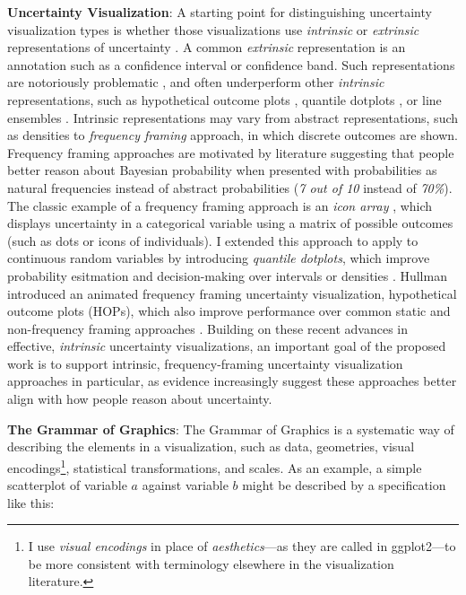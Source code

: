 \documentclass[11pt]{article}
\begin{document}
\noindent \textbf{Uncertainty Visualization}: A starting point for distinguishing uncertainty visualization types is whether those visualizations use \emph{intrinsic} or \emph{extrinsic} representations of uncertainty \cite{kay2016bus}. A common \emph{extrinsic} representation is an annotation such as a confidence interval or confidence band. Such representations are notoriously problematic \cite{belia2005ci}, and often underperform other \emph{intrinsic} representations, such as hypothetical outcome plots \cite{hullman2015hops, kale2018hypothetical}, quantile dotplots \cite{kay2016bus, Fernandes2018}, or line ensembles \cite{padilla2017effects}. Intrinsic representations may vary from abstract representations, such as densities \cite{Ibrekk1987} to \emph{frequency framing} approach, in which discrete outcomes are shown. Frequency framing approaches are motivated by literature suggesting that people better reason about Bayesian probability when presented with probabilities as natural frequencies instead of abstract probabilities \cite{Gigerenzer1995} (\eg \emph{7 out of 10} instead of \emph{70\%}). The classic example of a frequency framing approach is an \emph{icon array} \cite{Ancker2006}, which displays uncertainty in a categorical variable using a matrix of possible outcomes (such as dots or icons of individuals). I extended this approach to apply to continuous random variables by introducing \emph{quantile dotplots}, which improve probability esitmation and decision-making over intervals or densities \cite{kay2016bus, kale2018hypothetical}. Hullman \etal introduced an animated frequency framing uncertainty visualization, hypothetical outcome plots (HOPs), which also improve performance over common static and non-frequency framing approaches \cite{hullman2015hops,kale2018hypothetical}. Building on these recent advances in effective, \emph{intrinsic} uncertainty visualizations, an important goal of the proposed work is to support intrinsic, frequency-framing uncertainty visualization approaches in particular, as evidence increasingly suggest these approaches better align with how people reason about uncertainty.

\noindent \textbf{The Grammar of Graphics}: The Grammar of Graphics is a systematic way of describing the elements in a visualization, such as data, geometries, visual encodings\footnote{I use \emph{visual encodings} in place of \emph{aesthetics}---as they are called in ggplot2---to be more consistent with terminology elsewhere in the visualization literature.}, statistical transformations, and scales\cite{wilkinson_grammar_2005, Wickham2010layered_grammar, wickham2016ggplot2}. As an example, a simple scatterplot of variable $a$ against variable $b$ might be described by a specification like this:
\end{document}
